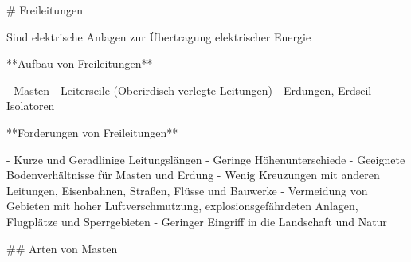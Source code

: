 \begin{markdown}

# Freileitungen

Sind elektrische Anlagen zur Übertragung elektrischer Energie


**Aufbau von Freileitungen**

- Masten
- Leiterseile (Oberirdisch verlegte Leitungen)
- Erdungen, Erdseil
- Isolatoren

**Forderungen von Freileitungen**

- Kurze und Geradlinige Leitungslängen
- Geringe Höhenunterschiede
- Geeignete Bodenverhältnisse für Masten und Erdung
- Wenig Kreuzungen mit anderen Leitungen, Eisenbahnen, Straßen, Flüsse und Bauwerke
- Vermeidung von Gebieten mit hoher Luftverschmutzung, explosionsgefährdeten Anlagen, Flugplätze und Sperrgebieten
- Geringer Eingriff in die Landschaft und Natur

## Arten von Masten

\end{markdown}

